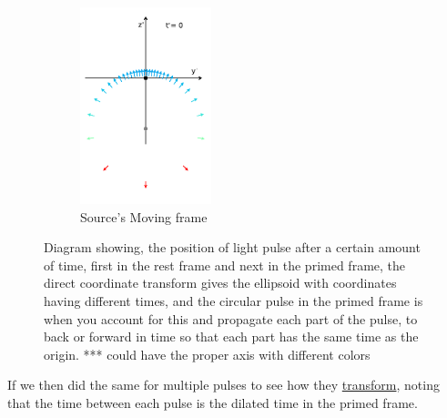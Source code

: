 \begin{figure}[H]
\begin{subfigure}{.32\textwidth}
		\includegraphics[width = 3.8cm]{images/pdf/Prime_Pulse_Simultaneous.pdf}
		\caption{Source's Moving frame}
	\end{subfigure}
	\caption{Diagram showing, the position of light pulse after a certain amount of time, first in the rest frame and next in the primed frame, the direct coordinate transform gives the ellipsoid with coordinates having different times, and the circular pulse in the primed frame is when you account for this and propagate each part of the pulse, to back or forward in time so that each part has the same time as the origin. *** could have the proper axis with different colors}
\end{figure}

If we then did the same for multiple pulses to see how they \hyperlink{def-transform}{transform}, noting that the time between each pulse is the dilated time in the primed frame.

